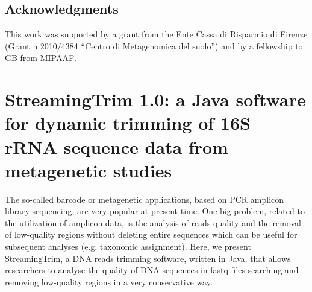 \subsection{Acknowledgments}
This work was supported by a grant from the Ente Cassa di Risparmio di Firenze (Grant n{\textdegree} 2010/4384 ``Centro di Metagenomica del suolo'') and by a fellowship to GB from MIPAAF.

\section{StreamingTrim 1.0: a Java software for dynamic trimming of 16S rRNA sequence data from metagenetic studies}
The so-called barcode or metagenetic applications, based on PCR amplicon library sequencing, are very popular at present time. One big problem, related to the utilization of amplicon data, is the analysis of reads quality and the removal of low-quality regions without deleting entire sequences which can be useful for subsequent analyses (e.g. taxonomic assignment). Here, we present StreamingTrim, a DNA reads trimming software, written in Java, that allows researchers to analyse the quality of DNA sequences in fastq files searching and removing low-quality regions in a very conservative way.\\
\newpage

\newpage

\backmatter
{}
\renewcommand{\sectionmark}[1]{\markright{#1}}
\sectionmark{Bibliography}
